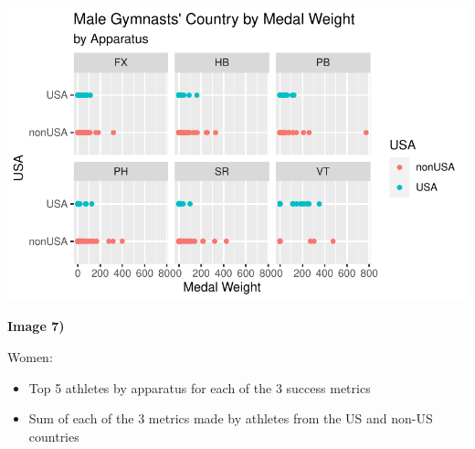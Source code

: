 \documentclass[
  letterpaper,
  DIV=11,
  numbers=noendperiod]{scrartcl}
\begin{document}
\includegraphics{Main_files/figure-pdf/unnamed-chunk-5-3.pdf}

\textbf{Image 7)}

Women:

\begin{itemize}
\item
  Top 5 athletes by apparatus for each of the 3 success metrics
\item
  Sum of each of the 3 metrics made by athletes from the US and non-US
  countries
\end{itemize}
\end{document}
